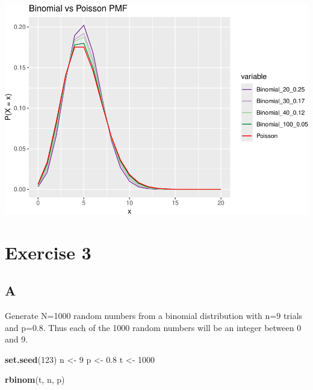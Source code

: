\documentclass[
]{article}
\newenvironment{Shaded}{\begin{snugshade}}{\end{snugshade}}
\newcommand{\DecValTok}[1]{\textcolor[rgb]{0.00,0.00,0.81}{#1}}
\newcommand{\FloatTok}[1]{\textcolor[rgb]{0.00,0.00,0.81}{#1}}
\newcommand{\KeywordTok}[1]{\textcolor[rgb]{0.13,0.29,0.53}{\textbf{#1}}}
\newcommand{\NormalTok}[1]{#1}
\newcommand{\StringTok}[1]{\textcolor[rgb]{0.31,0.60,0.02}{#1}}
\begin{document}
\includegraphics{es_files/figure-latex/unnamed-chunk-12-1.pdf}

\hypertarget{exercise-3}{%
\section{Exercise 3}\label{exercise-3}}

\hypertarget{a-2}{%
\subsection{A}\label{a-2}}

Generate N=1000 random numbers from a binomial distribution with n=9
trials and p=0.8. Thus each of the 1000 random numbers will be an
integer between 0 and 9.

\begin{Shaded}
\begin{Highlighting}[]
\KeywordTok{set.seed}\NormalTok{(}\DecValTok{123}\NormalTok{)}
\NormalTok{n \textless{}{-}}\StringTok{ }\DecValTok{9}
\NormalTok{p \textless{}{-}}\StringTok{ }\FloatTok{0.8}
\NormalTok{t \textless{}{-}}\StringTok{ }\DecValTok{1000}

\KeywordTok{rbinom}\NormalTok{(t, n, p)}
\end{Highlighting}
\end{Shaded}
\end{document}
